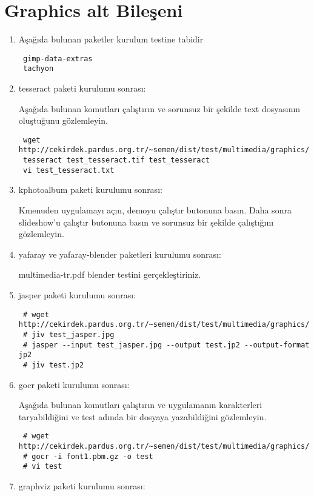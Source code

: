 \documentclass[a4paper,10pt]{article}
\begin{document}
\section{Graphics alt Bileşeni}
\begin{enumerate}
 \item Aşağıda bulunan paketler kurulum testine tabidir
\begin{verbatim}
 gimp-data-extras
 tachyon
\end{verbatim}
\item tesseract paketi kurulumu sonrası:

Aşağıda bulunan komutları çalıştırın ve sorunsuz bir şekilde text dosyasının oluştuğunu gözlemleyin.
\begin{verbatim}
 wget http://cekirdek.pardus.org.tr/~semen/dist/test/multimedia/graphics/test_tesseract.tif
 tesseract test_tesseract.tif test_tesseract
 vi test_tesseract.txt
\end{verbatim}


\item kphotoalbum paketi kurulumu sonrası:

Kmenuden uygulamayı açın, demoyu çalıştır butonuna basın. Daha sonra slideshow'u çalıştır butonuna basın ve sorunsuz bir şekilde çalıştığını gözlemleyin.

\item yafaray ve yafaray-blender paketleri kurulumu sonrası:

multimedia-tr.pdf blender testini gerçekleştiriniz.
\item jasper paketi kurulumu sonrası:

\begin{verbatim}
 # wget http://cekirdek.pardus.org.tr/~semen/dist/test/multimedia/graphics/test_jasper.jpg
 # jiv test_jasper.jpg
 # jasper --input test_jasper.jpg --output test.jp2 --output-format jp2
 # jiv test.jp2
\end{verbatim}


 \item gocr paketi kurulumu sonrası:

Aşağıda bulunan komutları çalıştırın ve uygulamanın karakterleri taryabildiğini ve test adında bir dosyaya yazabildiğini gözlemleyin.
\begin{verbatim}
 # wget http://cekirdek.pardus.org.tr/~semen/dist/test/multimedia/graphics/font1.pbm.gz
 # gocr -i font1.pbm.gz -o test
 # vi test
\end{verbatim}

\item graphviz paketi kurulumu sonrası:


\end{enumerate}
\end{document}
